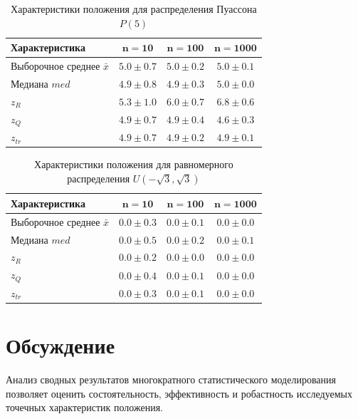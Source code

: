 \documentclass[a4paper, 14pt]{extarticle}
\begin{document}
\begin{table}[H]
    \centering
    \caption{Характеристики положения для распределения Пуассона $P(5)$}
    \label{tab:res_poisson}
    \begin{tabular}{|l|c|c|c|}
        \hline
        \textbf{Характеристика} & $\mathbf{n=10}$ & $\mathbf{n=100}$ & $\mathbf{n=1000}$ \\ \hline
        Выборочное среднее $\bar{x}$ & $5.0 \pm 0.7$ & $5.0 \pm 0.2$ & $5.0 \pm 0.1$ \\ \hline
        Медиана $med$ & $4.9 \pm 0.8$ & $4.9 \pm 0.3$ & $5.0 \pm 0.0$ \\ \hline
        $z_R$ & $5.3 \pm 1.0$ & $6.0 \pm 0.7$ & $6.8 \pm 0.6$ \\ \hline
        $z_Q$ & $4.9 \pm 0.7$ & $4.9 \pm 0.4$ & $4.6 \pm 0.3$ \\ \hline
        $z_{tr}$ & $4.9 \pm 0.7$ & $4.9 \pm 0.2$ & $4.9 \pm 0.1$ \\ \hline
    \end{tabular}
\end{table}

\begin{table}[H]
    \centering
    \caption{Характеристики положения для равномерного распределения $U(-\sqrt{3}, \sqrt{3})$}
    \label{tab:res_uniform}
    \begin{tabular}{|l|c|c|c|}
        \hline
        \textbf{Характеристика} & $\mathbf{n=10}$ & $\mathbf{n=100}$ & $\mathbf{n=1000}$ \\ \hline
        Выборочное среднее $\bar{x}$ & $0.0 \pm 0.3$ & $0.0 \pm 0.1$ & $0.0 \pm 0.0$ \\ \hline
        Медиана $med$ & $0.0 \pm 0.5$ & $0.0 \pm 0.2$ & $0.0 \pm 0.1$ \\ \hline
        $z_R$ & $0.0 \pm 0.2$ & $0.0 \pm 0.0$ & $0.0 \pm 0.0$ \\ \hline
        $z_Q$ & $0.0 \pm 0.4$ & $0.0 \pm 0.1$ & $0.0 \pm 0.0$ \\ \hline
        $z_{tr}$ & $0.0 \pm 0.3$ & $0.0 \pm 0.1$ & $0.0 \pm 0.0$ \\ \hline
    \end{tabular}
\end{table}
\section{Обсуждение}

Анализ сводных результатов многократного статистического моделирования позволяет оценить состоятельность, эффективность и робастность исследуемых точечных характеристик положения.
\end{document}
